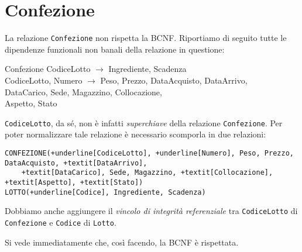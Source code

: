 \section{Confezione}\label{sec:confezione}
La relazione {\tt Confezione} non rispetta la BCNF. Riportiamo di seguito tutte
le dipendenze funzionali non banali della relazione in questione:
\begin{funcdep}{Confezione}
    CodiceLotto $\to$ Ingrediente, Scadenza\\
    CodiceLotto, Numero $\to$ Peso, Prezzo, DataAcquisto, DataArrivo,\\
        \indent\indent\indent\indent\indent DataCarico, Sede, Magazzino, Collocazione,\\
        \indent\indent\indent\indent\indent Aspetto, Stato
\end{funcdep}

\noindent\texttt{CodiceLotto}, da sé, non è infatti {\it superchiave} della relazione {\tt Confezione}.
Per poter normalizzare tale relazione è necessario scomporla in due relazioni:

\begin{Verbatim}[commandchars=+\[\]]
CONFEZIONE(+underline[CodiceLotto], +underline[Numero], Peso, Prezzo, DataAcquisto, +textit[DataArrivo],
    +textit[DataCarico], Sede, Magazzino, +textit[Collocazione], +textit[Aspetto], +textit[Stato])
LOTTO(+underline[Codice], Ingrediente, Scadenza)
\end{Verbatim}
Dobbiamo anche aggiungere il {\it vincolo di integrità referenziale} tra {\tt CodiceLotto}
di {\tt Confezione} e {\tt Codice} di {\tt Lotto}.

\vspace{10pt}
\noindent Si vede immediatamente che, così facendo, la BCNF è rispettata.
